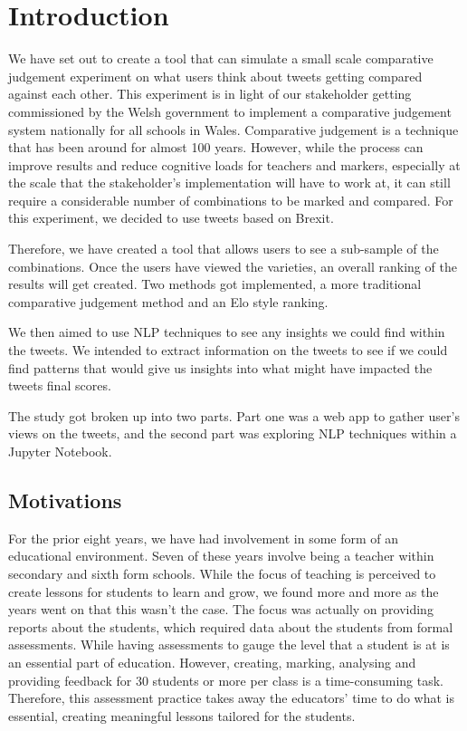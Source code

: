 \chapter{Introduction}
	\label{chap:intro}
	We have set out to create a tool that can simulate a small scale comparative judgement experiment on what users think about tweets getting compared against each other. This experiment is in light of our stakeholder getting commissioned by the Welsh government to implement a comparative judgement system nationally for all schools in Wales. Comparative judgement is a technique that has been around for almost 100 years. However, while the process can improve results and reduce cognitive loads for teachers and markers, especially at the scale that the stakeholder's implementation will have to work at, it can still require a considerable number of combinations to be marked and compared. For this experiment, we decided to use tweets based on Brexit.
	
	Therefore, we have created a tool that allows users to see a sub-sample of the combinations. Once the users have viewed the varieties, an overall ranking of the results will get created. Two methods got implemented, a more traditional comparative judgement method and an Elo style ranking.
	
	We then aimed to use NLP techniques to see any insights we could find within the tweets. We intended to extract information on the tweets to see if we could find patterns that would give us insights into what might have impacted the tweets final scores.
	
	The study got broken up into two parts. Part one was a web app to gather user's views on the tweets, and the second part was exploring NLP techniques within a Jupyter Notebook.


	\section{Motivations}
		\label{sec:intro_motivation} 
	For the prior eight years, we have had involvement in some form of an educational environment. Seven of these years involve being a teacher within secondary and sixth form schools. While the focus of teaching is perceived to create lessons for students to learn and grow, we found more and more as the years went on that this wasn't the case. The focus was actually on providing reports about the students, which required data about the students from formal assessments. While having assessments to gauge the level that a student is at is an essential part of education. However, creating, marking, analysing and providing feedback for 30 students or more per class is a time-consuming task. Therefore, this assessment practice takes away the educators' time to do what is essential, creating meaningful lessons tailored for the students.
	
